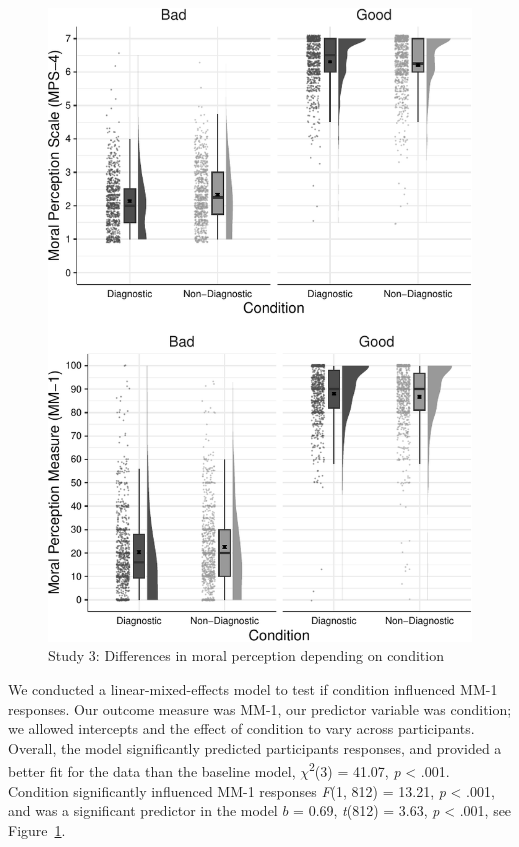 \documentclass[
  man,floatsintext]{apa7}
\begin{document}
\begin{figure}
\centering
\includegraphics{moral_dilution_in_chunks_files/figure-latex/S3bothconditionplot-1.pdf}
\caption{\label{fig:S3bothconditionplot}Study 3: Differences in moral perception depending on condition}
\end{figure}

We conducted a linear-mixed-effects model to test if condition influenced MM-1 responses. Our outcome measure was MM-1, our predictor variable was condition; we allowed intercepts and the effect of condition to vary across participants. Overall, the model significantly predicted participants responses, and provided a better fit for the data than the baseline model, \(\chi\)\textsuperscript{2}(3) = 41.07, \emph{p} \textless{} .001. Condition significantly influenced MM-1 responses \emph{F}(1, 812) = 13.21, \emph{p} \textless{} .001, and was a significant predictor in the model \(b\) = 0.69, \emph{t}(812) = 3.63, \emph{p} \textless{} .001, see Figure~\ref{fig:S3bothconditionplot}.
\end{document}
